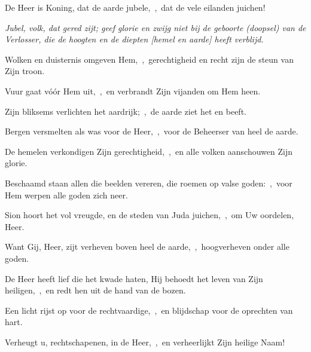 \documentclass[12pt,twoside,a5paper]{article}
\begin{document}

\begin{halfparskip}

  De Heer is Koning, dat de aarde jubele,~\sep\ dat de vele eilanden juichen!


  \liturgicallbracket{} \emph{Jubel, volk, dat gered zijt; geef glorie en zwijg niet bij de geboorte (doopsel) van de Verlosser, die de hoogten en de diepten [hemel en aarde] heeft verblijd.}\liturgicalrbracket

  Wolken en duisternis omgeven Hem,~\sep\ gerechtigheid en recht zijn de steun van Zijn troon.

  Vuur gaat vóór Hem uit,~\sep\ en verbrandt Zijn vijanden om Hem heen.

  Zijn bliksems verlichten het aardrijk;~\sep\ de aarde ziet het en beeft.

  Bergen versmelten als was voor de Heer,~\sep\ voor de Beheerser van heel de aarde.

  De hemelen verkondigen Zijn gerechtigheid,~\sep\ en alle volken aanschouwen Zijn glorie.
\end{halfparskip}

\begin{halfparskip}

  Beschaamd staan allen die beelden vereren, die roemen op valse goden:~\sep\ voor Hem werpen alle goden zich neer.

  Sion hoort het vol vreugde, en de steden van Juda juichen,~\sep\ om Uw oordelen, Heer.

  Want Gij, Heer, zijt verheven boven heel de aarde,~\sep\ hoogverheven onder alle goden.

  De Heer heeft lief die het kwade haten, Hij behoedt het leven van Zijn heiligen,~\sep\ en redt hen uit de hand van de bozen.

  Een licht rijst op voor de rechtvaardige,~\sep\ en blijdschap voor de oprechten van hart.

  Verheugt u, rechtschapenen, in de Heer,~\sep\ en verheerlijkt Zijn heilige Naam!
\end{halfparskip}

\end{document}
